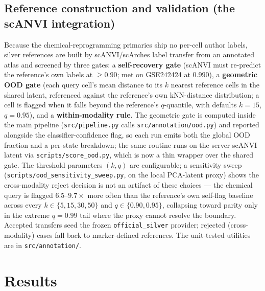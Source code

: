 \documentclass[11pt]{article}
\newcommand{\code}[1]{\texttt{\small #1}}
\begin{document}
\subsection{Reference construction and validation (the scANVI integration)}
\label{sec:refval}
Because the chemical-reprogramming primaries ship no per-cell author labels, silver
references are built by scANVI/scArches \citep{xu2021,lotfollahi2022} label transfer
from an annotated atlas and screened by three gates: a \textbf{self-recovery gate}
(scANVI must re-predict the reference's own labels at $\geq0.90$; met on GSE242424 at
$0.990$), a \textbf{geometric OOD gate} (each query cell's mean distance to its $k$
nearest reference cells in the shared latent, referenced against the reference's own
kNN-distance distribution; a cell is flagged when it falls beyond the reference's
$q$-quantile, with defaults $k=15$, $q=0.95$), and a \textbf{within-modality rule}.
The geometric gate is computed inside the main pipeline (\code{src/pipeline.py} calls
\code{src/annotation/ood.py}) and reported alongside the classifier-confidence flag, so
each run emits both the global OOD fraction and a per-state breakdown; the same routine
runs on the server scANVI latent via \code{scripts/score\_ood.py}, which is now a thin
wrapper over the shared gate. The threshold parameters $(k,q)$ are configurable; a
sensitivity sweep (\code{scripts/ood\_sensitivity\_sweep.py}, on the local PCA-latent
proxy) shows the cross-modality reject decision is not an artifact of these choices ---
the chemical query is flagged $6.5$--$9.7\times$ more often than the reference's own
self-flag baseline across every $k\in\{5,15,30,50\}$ and $q\in\{0.90,0.95\}$,
collapsing toward parity only in the extreme $q=0.99$ tail where the proxy cannot
resolve the boundary. Accepted transfers seed the frozen \code{official\_silver} provider;
rejected (cross-modality) cases fall back to marker-defined references. The unit-tested
utilities are in \code{src/annotation/}.

\section{Results}
\end{document}
